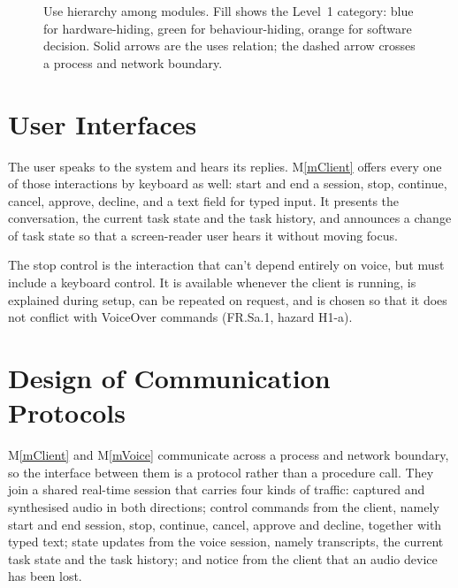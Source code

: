 \documentclass[12pt, titlepage]{article}
\newcommand{\mref}[1]{M\ref{#1}}
\begin{document}
\begin{figure}[H]
{}
\caption{Use hierarchy among modules. Fill shows the Level~1 category:
blue for hardware-hiding, green for behaviour-hiding, orange for software
decision. Solid arrows are the uses relation; the dashed arrow crosses a
process and network boundary.}
\label{FigUH}
\end{figure}

\section{User Interfaces}

The user speaks to the system and hears its replies. \mref{mClient} offers every
one of those interactions by keyboard as well: start and end a session, stop,
continue, cancel, approve, decline, and a text field for typed input. It presents
the conversation, the current task state and the task history, and announces a
change of task state so that a screen-reader user hears it without moving focus.

The stop control is the interaction that can't depend entirely on voice, but must include 
a keyboard control. It is available whenever the client is running, is explained during 
setup, can be repeated on request, and is chosen so that it does not conflict with VoiceOver
commands (FR.Sa.1, hazard H1-a).

\section{Design of Communication Protocols} \label{SecProtocols}

\mref{mClient} and \mref{mVoice} communicate across a process and network
boundary, so the interface between them is a protocol rather than a procedure
call. They join a shared real-time session that carries four kinds of traffic:
captured and synthesised audio in both directions; control commands from the
client, namely start and end session, stop, continue, cancel, approve and
decline, together with typed text; state updates from the voice session, namely
transcripts, the current task state and the task history; and notice from the client that an audio
device has been lost.
\end{document}
